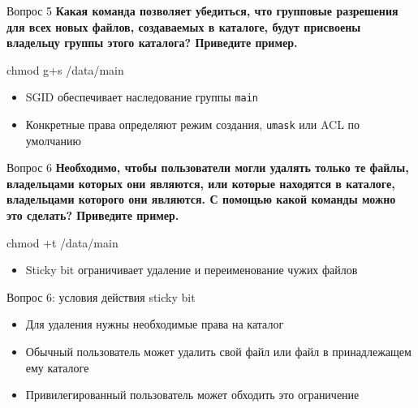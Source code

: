 \documentclass[
  ignorenonframetext,
  aspectratio=169,
  russian,
]{beamer}
\newenvironment{Shaded}{\begin{snugshade}}{\end{snugshade}}
\newcommand{\FunctionTok}[1]{\textcolor[rgb]{0.28,0.35,0.67}{#1}}
\newcommand{\NormalTok}[1]{\textcolor[rgb]{0.00,0.23,0.31}{#1}}
\providecommand{\tightlist}{%
  \setlength{\itemsep}{0pt}\setlength{\parskip}{0pt}}
\begin{document}
\begin{frame}[fragile]{Вопрос 5}
\protect{}\label{ux432ux43eux43fux440ux43eux441-5}
\textbf{Какая команда позволяет убедиться, что групповые разрешения для
всех новых файлов, создаваемых в каталоге, будут присвоены владельцу
группы этого каталога? Приведите пример.}

\begin{Shaded}
\begin{Highlighting}[]
\FunctionTok{chmod}\NormalTok{ g+s /data/main}
\end{Highlighting}
\end{Shaded}

\begin{itemize}
\tightlist
\item
  SGID обеспечивает наследование группы \texttt{main}
\item
  Конкретные права определяют режим создания, \texttt{umask} или ACL по
  умолчанию
\end{itemize}
\end{frame}

\begin{frame}[fragile]{Вопрос 6}
\protect{}\label{ux432ux43eux43fux440ux43eux441-6}
\textbf{Необходимо, чтобы пользователи могли удалять только те файлы,
владельцами которых они являются, или которые находятся в каталоге,
владельцами которого они являются. С помощью какой команды можно это
сделать? Приведите пример.}

\begin{Shaded}
\begin{Highlighting}[]
\FunctionTok{chmod}\NormalTok{ +t /data/main}
\end{Highlighting}
\end{Shaded}

\begin{itemize}
\tightlist
\item
  Sticky bit ограничивает удаление и переименование чужих файлов
\end{itemize}
\end{frame}

\begin{frame}{Вопрос 6: условия действия sticky bit}
\protect{}\label{ux432ux43eux43fux440ux43eux441-6-ux443ux441ux43bux43eux432ux438ux44f-ux434ux435ux439ux441ux442ux432ux438ux44f-sticky-bit}
\begin{itemize}
\tightlist
\item
  Для удаления нужны необходимые права на каталог
\item
  Обычный пользователь может удалить свой файл или файл в принадлежащем
  ему каталоге
\item
  Привилегированный пользователь может обходить это ограничение
\end{itemize}
\end{frame}
\end{document}
